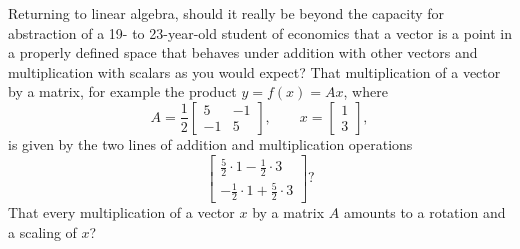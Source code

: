 \documentclass[10pt]{article}
\begin{document}
Returning to linear algebra, should it really be beyond the capacity for abstraction of a 19- to 23-year-old student of economics that a vector is a point in a properly defined space that behaves under addition with other vectors and multiplication with scalars as you would expect? That multiplication of a vector by a matrix, for example the product $y=f(x)=Ax$, where
\[
A = \frac{1}{2}\left[\begin{array}{cc}
5 & -1 \\
-1 & 5
\end{array}\right],\qquad 
x = \left[\begin{array}{c}
1 \\ 3
\end{array}\right],
\]
is given by the two lines of addition and multiplication operations
\[
\left[\begin{array}{c}
\frac{5}{2} \cdot 1 - \frac{1}{2}\cdot 3 \\
-\frac{1}{2} \cdot 1 + \frac{5}{2}\cdot 3
\end{array}\right]?
\]
That every multiplication of a vector $x$ by a matrix $A$ amounts to a rotation and a scaling of $x$?
\end{document}
